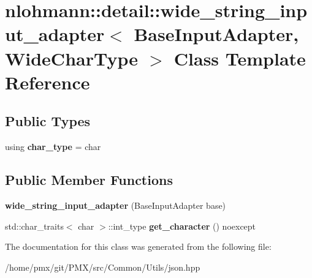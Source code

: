 \hypertarget{classnlohmann_1_1detail_1_1wide__string__input__adapter}{}\section{nlohmann\+:\+:detail\+:\+:wide\+\_\+string\+\_\+input\+\_\+adapter$<$ Base\+Input\+Adapter, Wide\+Char\+Type $>$ Class Template Reference}
\label{classnlohmann_1_1detail_1_1wide__string__input__adapter}
\subsection*{Public Types}
\begin{DoxyCompactItemize}
\item 
\mbox{\label{classnlohmann_1_1detail_1_1wide__string__input__adapter_a7b9f8684206b5dadf0e96986577dfc24}} 
using {\bfseries char\+\_\+type} = char
\end{DoxyCompactItemize}
\subsection*{Public Member Functions}
\begin{DoxyCompactItemize}
\item 
\mbox{\label{classnlohmann_1_1detail_1_1wide__string__input__adapter_aa12146f16f0a22ae3d23bd4af7460fcd}} 
{\bfseries wide\+\_\+string\+\_\+input\+\_\+adapter} (Base\+Input\+Adapter base)
\item 
\mbox{\label{classnlohmann_1_1detail_1_1wide__string__input__adapter_a50f9436820b9caa9708ea69e2ba0230b}} 
std\+::char\+\_\+traits$<$ char $>$\+::int\+\_\+type {\bfseries get\+\_\+character} () noexcept
\end{DoxyCompactItemize}


The documentation for this class was generated from the following file\+:\begin{DoxyCompactItemize}
\item 
/home/pmx/git/\+P\+M\+X/src/\+Common/\+Utils/json.\+hpp\end{DoxyCompactItemize}
